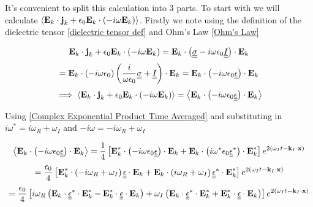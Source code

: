 It's convenient to split this calculation into 3 parts. To start with we will calculate $\left \langle \textbf{E}_k \cdot \textbf{j}_k + \epsilon_0 \textbf{E}_k \cdot \left( -i \omega \textbf{E}_k \right) \right \rangle$. Firstly we note using the definition of the dielectric tensor \eqref{dielectric tensor def} and Ohm's Law \eqref{Ohm's Law}

\begin{equation*}
	\textbf{E}_k \cdot \textbf{j}_k + \epsilon_0 \textbf{E}_k \cdot \left( -i \omega \textbf{E}_k \right) = \textbf{E}_k \cdot \left( \underline{\underline{\sigma}} - i \omega \epsilon_0 \underline{\underline{I}} \right) \cdot \textbf{E}_k
\end{equation*}
\begin{equation*}
	= \textbf{E}_k \cdot \left( - i \omega \epsilon_0 \right) \left( \frac{i}{\omega \epsilon_0} \underline{\underline{\sigma}} + \underline{\underline{I}} \right) \cdot \textbf{E}_k = \textbf{E}_k \cdot \left( - i \omega \epsilon_0 \underline{\underline{\epsilon}} \right) \cdot \textbf{E}_k
\end{equation*}
\begin{equation}
	\implies \left \langle \textbf{E}_k \cdot \textbf{j}_k + \epsilon_0 \textbf{E}_k \cdot \left( -i \omega \textbf{E}_k \right) \right \rangle = \left \langle \textbf{E}_k \cdot \left( - i \omega \epsilon_0 \underline{\underline{\epsilon}} \right) \cdot \textbf{E}_k \right \rangle
\end{equation}

Using \eqref{Complex Exponential Product Time Averaged} and substituting in $i \omega^* = i \omega_R + \omega_I$ and $-i \omega = -i \omega_R + \omega_I$

\begin{equation*}
	\left \langle \textbf{E}_k \cdot \left( - i \omega \epsilon_0 \underline{\underline{\epsilon}} \right) \cdot \textbf{E}_k \right \rangle = \frac{1}{4} \left[ \textbf{E}_k^* \cdot \left( - i \omega \epsilon_0 \underline{\underline{\epsilon}} \right) \cdot \textbf{E}_k + \textbf{E}_k \cdot \left( i \omega^* \epsilon_0 \underline{\underline{\epsilon}}^* \right) \cdot \textbf{E}_k^* \right] e^{2 \left( \omega_I t - \textbf{k}_I \cdot \textbf{x} \right)}
\end{equation*}
\begin{equation*}
	= \frac{\epsilon_0}{4} \left[ \textbf{E}_k^* \cdot \left( -i \omega_R + \omega_I \right) \underline{\underline{\epsilon}} \cdot \textbf{E}_k + \textbf{E}_k \cdot \left( i \omega_R + \omega_I \right) \underline{\underline{\epsilon}}^* \cdot \textbf{E}_k^* \right] e^{2 \left( \omega_I t - \textbf{k}_I \cdot \textbf{x} \right)}
\end{equation*}
\begin{equation}
	= \frac{\epsilon_0}{4} \left[ i \omega_R \left( \textbf{E}_k \cdot \underline{\underline{\epsilon}}^* \cdot \textbf{E}_k^* - \textbf{E}_k^* \cdot \underline{\underline{\epsilon}} \cdot \textbf{E}_k \right) + \omega_I \left( \textbf{E}_k \cdot \underline{\underline{\epsilon}}^* \cdot \textbf{E}_k^* + \textbf{E}_k^* \cdot \underline{\underline{\epsilon}} \cdot \textbf{E}_k \right) \right] e^{2 \left( \omega_I t - \textbf{k}_I \cdot \textbf{x} \right)}
\end{equation}

